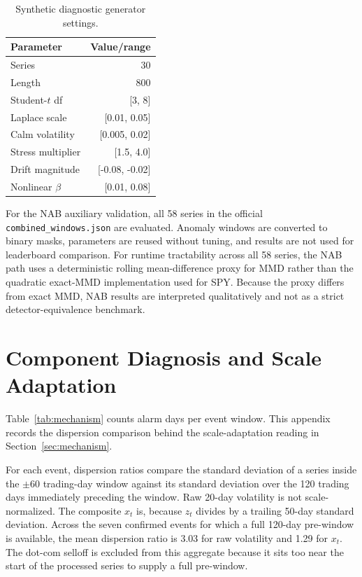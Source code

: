 \documentclass[pdflatex,sn-mathphys-num,iicol]{sn-jnl}
\begin{document}
\begin{appendices}
\begin{table}[t]
\centering
\caption{Synthetic diagnostic generator settings.}
\label{tab:synthetic_params}
\scriptsize
\begin{tabular}{lr}
\toprule
Parameter & Value/range\\
\midrule
Series & 30\\
Length & 800\\
Student-$t$ df & [3, 8]\\
Laplace scale & [0.01, 0.05]\\
Calm volatility & [0.005, 0.02]\\
Stress multiplier & [1.5, 4.0]\\
Drift magnitude & [-0.08, -0.02]\\
Nonlinear $\beta$ & [0.01, 0.08]\\
\bottomrule
\end{tabular}
\end{table}

For the NAB auxiliary validation, all 58 series in the official \texttt{combined\_windows.json} are evaluated. Anomaly windows are converted to binary masks, parameters are reused without tuning, and results are not used for leaderboard comparison. For runtime tractability across all 58 series, the NAB path uses a deterministic rolling mean-difference proxy for MMD rather than the quadratic exact-MMD implementation used for SPY. Because the proxy differs from exact MMD, NAB results are interpreted qualitatively and not as a strict detector-equivalence benchmark.

\section{Component Diagnosis and Scale Adaptation}
\label{app:mechanism}
Table~\ref{tab:mechanism} counts alarm days per event window. This appendix records the dispersion comparison behind the scale-adaptation reading in Section~\ref{sec:mechanism}.

For each event, dispersion ratios compare the standard deviation of a series inside the $\pm60$ trading-day window against its standard deviation over the 120 trading days immediately preceding the window. Raw 20-day volatility is not scale-normalized. The composite $x_t$ is, because $z_t$ divides by a trailing 50-day standard deviation. Across the seven confirmed events for which a full 120-day pre-window is available, the mean dispersion ratio is 3.03 for raw volatility and 1.29 for $x_t$. The dot-com selloff is excluded from this aggregate because it sits too near the start of the processed series to supply a full pre-window.


\end{appendices}
\end{document}
